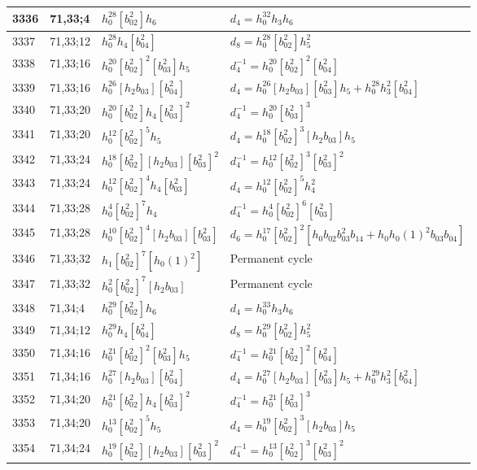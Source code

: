 \documentclass{article}
\begin{document}
\begin{longtable}{|l|l|>{\raggedright\arraybackslash}p{6cm}|>{\raggedright\arraybackslash}p{6cm}|}
\hline
3336 & 71,33;4 & $h_0^{28}[b_{02}^2]h_6$ &$d_{4}=h_0^{32}h_3h_6$\\
\hline
3337 & 71,33;12 & $h_0^{28}h_4[b_{04}^2]$ &$d_{8}=h_0^{28}[b_{02}^2]h_5^2$\\
\hline
3338 & 71,33;16 & $h_0^{20}[b_{02}^2]^2[b_{03}^2]h_5$ & $d_{4}^{-1}=h_0^{20}[b_{02}^2]^2[b_{04}^2]$\\
3339 & 71,33;16 & $h_0^{26}[h_2b_{03}][b_{04}^2]$ &$d_{4}=h_0^{26}[h_2b_{03}][b_{03}^2]h_5 + h_0^{28}h_3^2[b_{04}^2]$\\
\hline
3340 & 71,33;20 & $h_0^{20}[b_{02}^2]h_4[b_{03}^2]^2$ & $d_{4}^{-1}=h_0^{20}[b_{03}^2]^3$\\
3341 & 71,33;20 & $h_0^{12}[b_{02}^2]^5h_5$ &$d_{4}=h_0^{18}[b_{02}^2]^3[h_2b_{03}]h_5$\\
\hline
3342 & 71,33;24 & $h_0^{18}[b_{02}^2][h_2b_{03}][b_{03}^2]^2$ & $d_{4}^{-1}=h_0^{12}[b_{02}^2]^3[b_{03}^2]^2$\\
3343 & 71,33;24 & $h_0^{12}[b_{02}^2]^4h_4[b_{03}^2]$ &$d_{4}=h_0^{12}[b_{02}^2]^5h_4^2$\\
\hline
3344 & 71,33;28 & $h_0^4[b_{02}^2]^7h_4$ & $d_{4}^{-1}=h_0^4[b_{02}^2]^6[b_{03}^2]$\\
3345 & 71,33;28 & $h_0^{10}[b_{02}^2]^4[h_2b_{03}][b_{03}^2]$ &$d_{6}=h_0^{17}[b_{02}^2]^2[h_0b_{02}b_{03}^2b_{14} + h_0h_0(1)^2b_{03}b_{04}]$\\
\hline
3346 & 71,33;32 & $h_1[b_{02}^2]^7[h_0(1)^2]$ & Permanent cycle\\
3347 & 71,33;32 & $h_0^2[b_{02}^2]^7[h_2b_{03}]$ & Permanent cycle\\
\hline
3348 & 71,34;4 & $h_0^{29}[b_{02}^2]h_6$ &$d_{4}=h_0^{33}h_3h_6$\\
\hline
3349 & 71,34;12 & $h_0^{29}h_4[b_{04}^2]$ &$d_{8}=h_0^{29}[b_{02}^2]h_5^2$\\
\hline
3350 & 71,34;16 & $h_0^{21}[b_{02}^2]^2[b_{03}^2]h_5$ & $d_{4}^{-1}=h_0^{21}[b_{02}^2]^2[b_{04}^2]$\\
3351 & 71,34;16 & $h_0^{27}[h_2b_{03}][b_{04}^2]$ &$d_{4}=h_0^{27}[h_2b_{03}][b_{03}^2]h_5 + h_0^{29}h_3^2[b_{04}^2]$\\
\hline
3352 & 71,34;20 & $h_0^{21}[b_{02}^2]h_4[b_{03}^2]^2$ & $d_{4}^{-1}=h_0^{21}[b_{03}^2]^3$\\
3353 & 71,34;20 & $h_0^{13}[b_{02}^2]^5h_5$ &$d_{4}=h_0^{19}[b_{02}^2]^3[h_2b_{03}]h_5$\\
\hline
3354 & 71,34;24 & $h_0^{19}[b_{02}^2][h_2b_{03}][b_{03}^2]^2$ & $d_{4}^{-1}=h_0^{13}[b_{02}^2]^3[b_{03}^2]^2$\\

\end{longtable}
\end{document}
